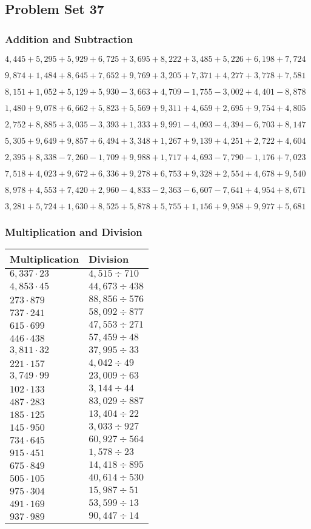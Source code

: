 \hypertarget{problem-set-37-3}{%
\subsection{Problem Set 37}\label{problem-set-37-3}}

\hypertarget{addition-and-subtraction-199}{%
\subsubsection{Addition and
Subtraction}\label{addition-and-subtraction-199}}

\(4,445+5,295+5,929+6,725+3,695+8,222+3,485+5,226+6,198+ 7,724\)

\(9,874+1,484+8,645+7,652+9,769+3,205+7,371+4,277+3,778+7,581\)

\(8,151+1,052+5,129+5,930-3,663+4,709-1,755-3,002+4,401-8,878\)

\(1,480+9,078+6,662+5,823+5,569+9,311+4,659+2,695+9,754+4,805\)

\(2,752+8,885+3,035-3,393+1,333+9,991-4,093-4,394-6,703+8,147\)

\(5,305+9,649+9,857+6,494+3,348+1,267+9,139+4,251+2,722+4,604\)

\(2,395+8,338-7,260-1,709+9,988+1,717+4,693-7,790-1,176+7,023\)

\(7,518+4,023+9,672+6,336+9,278+6,753+9,328+2,554+4,678+9,540\)

\(8,978+4,553+7,420+2,960-4,833-2,363-6,607-7,641+4,954+8,671\)

\(3,281+5,724+1,630+8,525+5,878+5,755+1,156+9,958+9,977+5,681\)

\hypertarget{multiplication-and-division-198}{%
\subsubsection{Multiplication and
Division}\label{multiplication-and-division-198}}

\begin{longtable}[]{@{}ll@{}}
\toprule
Multiplication & Division\tabularnewline
\midrule
\endhead
\(6,337\cdot23\) & \(4,515÷710\)\tabularnewline
\(4,853\cdot45\) & \(44,673÷438\)\tabularnewline
\(273\cdot879\) & \(88,856÷576\)\tabularnewline
\(737\cdot241\) & \(58,092÷877\)\tabularnewline
\(615\cdot699\) & \(47,553÷271\)\tabularnewline
\(446\cdot438\) & \(57,459÷48\)\tabularnewline
\(3,811\cdot32\) & \(37,995÷33\)\tabularnewline
\(221\cdot157\) & \(4,042÷49\)\tabularnewline
\(3,749\cdot99\) & \(23,009÷63\)\tabularnewline
\(102\cdot133\) & \(3,144÷44\)\tabularnewline
\(487\cdot283\) & \(83,029÷887\)\tabularnewline
\(185\cdot125\) & \(13,404÷22\)\tabularnewline
\(145\cdot950\) & \(3,033÷927\)\tabularnewline
\(734\cdot645\) & \(60,927÷564\)\tabularnewline
\(915\cdot451\) & \(1,578÷23\)\tabularnewline
\(675\cdot849\) & \(14,418÷895\)\tabularnewline
\(505\cdot105\) & \(40,614÷530\)\tabularnewline
\(975\cdot304\) & \(15,987÷51\)\tabularnewline
\(491\cdot169\) & \(53,599÷13\)\tabularnewline
\(937\cdot989\) & \(90,447÷14\)\tabularnewline
\bottomrule
\end{longtable}

